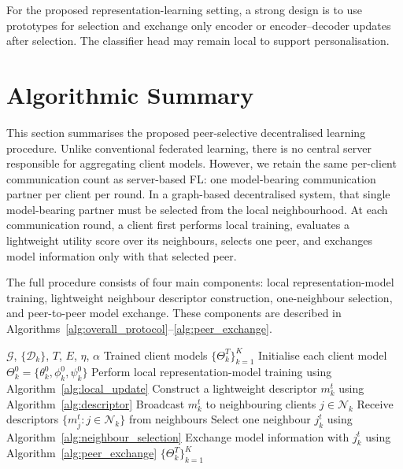 \documentclass[conference]{IEEEtran}
\begin{document}
For the proposed representation-learning setting, a strong design is to use prototypes for selection and exchange only encoder or encoder--decoder updates after selection. The classifier head may remain local to support personalisation.

\section{Algorithmic Summary}
\label{sec:algorithm}

This section summarises the proposed peer-selective decentralised learning procedure. Unlike conventional federated learning, there is no central server responsible for aggregating client models. However, we retain the same per-client communication count as server-based FL: one model-bearing communication partner per client per round. In a graph-based decentralised system, that single model-bearing partner must be selected from the local neighbourhood. At each communication round, a client first performs local training, evaluates a lightweight utility score over its neighbours, selects one peer, and exchanges model information only with that selected peer.

The full procedure consists of four main components: local representation-model training, lightweight neighbour descriptor construction, one-neighbour selection, and peer-to-peer model exchange. These components are described in Algorithms~\ref{alg:overall_protocol}--\ref{alg:peer_exchange}.

\begin{algorithm}[t]
\caption{Peer-Selective Decentralised Representation Learning}
\label{alg:overall_protocol}
\footnotesize
\begin{algorithmic}[1]
\REQUIRE $\mathcal{G}$, $\{\mathcal{D}_k\}$, $T$, $E$, $\eta$, $\alpha$
\ENSURE Trained client models $\{\Theta_k^T\}_{k=1}^{K}$
\STATE Initialise each client model $\Theta_k^0=\{\theta_k^0,\phi_k^0,\psi_k^0\}$
        \STATE Perform local representation-model training using Algorithm~\ref{alg:local_update}
        \STATE Construct a lightweight descriptor $m_k^t$ using Algorithm~\ref{alg:descriptor}
        \STATE Broadcast $m_k^t$ to neighbouring clients $j\in\mathcal{N}_k$
    \ENDFOR
        \STATE Receive descriptors $\{m_j^t:j\in\mathcal{N}_k\}$ from neighbours
        \STATE Select one neighbour $j_k^t$ using Algorithm~\ref{alg:neighbour_selection}
        \STATE Exchange model information with $j_k^t$ using Algorithm~\ref{alg:peer_exchange}
    \ENDFOR
\ENDFOR
\RETURN $\{\Theta_k^T\}_{k=1}^{K}$
\end{algorithmic}
\end{algorithm} 
\end{document}
